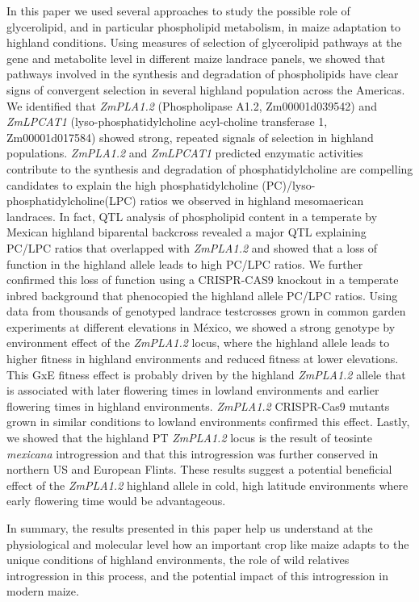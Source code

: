 \documentclass[9pt,twocolumn,twoside,lineno]{BioRxiv}
\begin{document}
In this paper we used several approaches to study the possible role of glycerolipid, and in particular phospholipid metabolism, in maize adaptation to highland conditions. 
Using measures of selection of glycerolipid pathways at the gene and metabolite level in different maize landrace panels, we showed that pathways involved in the synthesis and degradation of phospholipids have clear signs of convergent selection in several highland population across the Americas. 
We identified that \textit{ZmPLA1.2} (Phospholipase A1.2, Zm00001d039542) and \textit{ZmLPCAT1} (lyso-phosphatidylcholine acyl-choline transferase 1, Zm00001d017584) showed strong, repeated signals of selection in highland populations. 
\textit{ZmPLA1.2} and \textit{ZmLPCAT1} predicted enzymatic activities contribute to the synthesis and degradation of phosphatidylcholine are compelling candidates to explain the high phosphatidylcholine (PC)/lyso-phosphatidylcholine(LPC) ratios we observed in highland mesomaerican landraces. 
In fact, QTL analysis of phospholipid content in a temperate by Mexican highland biparental backcross revealed a major QTL explaining PC/LPC ratios that overlapped with \textit{ZmPLA1.2} and showed that a loss of function in the highland allele leads to high PC/LPC ratios. 
We further confirmed this loss of function using a CRISPR-CAS9 knockout in a temperate inbred background that phenocopied the highland allele PC/LPC ratios. 
Using data from thousands of genotyped landrace testcrosses grown in common garden experiments at different elevations in México, we showed a strong genotype by environment effect of the \textit{ZmPLA1.2} locus, 
where the highland allele leads to higher fitness in highland environments and reduced fitness at lower elevations. 
This GxE fitness effect is probably driven by the highland \textit{ZmPLA1.2} allele that is associated with later flowering times in lowland environments and earlier flowering times in highland environments. 
\textit{ZmPLA1.2} CRISPR-Cas9 mutants grown in similar conditions to lowland environments confirmed this effect.
Lastly, we showed that the highland PT \textit{ZmPLA1.2} locus is the result of teosinte \textit{mexicana} introgression and that this introgression was further conserved in northern US and European Flints. 
These results suggest a potential beneficial effect of the \textit{ZmPLA1.2} highland allele in cold, high latitude environments where early flowering time would be advantageous.

In summary, the results presented in this paper help us understand at the physiological and molecular level how an important crop like maize adapts to the unique conditions of highland environments, the role of wild relatives introgression in this process, and the potential impact of this introgression in modern maize.
\end{document}
